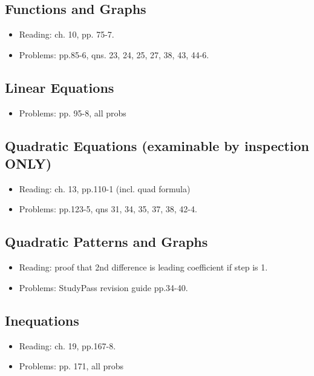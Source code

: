 \documentclass[a4paper]{amsart}
\theoremstyle{definition}
\theoremstyle{remark}
\begin{document}
  \subsection{Functions and Graphs}
  \begin{itemize}
    \item Reading: ch. 10, pp. 75-7.
    \item Problems: pp.85-6, qns. 23, 24, 25, 27, 38, 43, 44-6.
  \end{itemize}

  \subsection{Linear Equations}
  \begin{itemize}
    \item Problems: pp. 95-8, all probs
  \end{itemize}

  \subsection{Quadratic Equations (examinable by inspection ONLY)}
  \begin{itemize}
    \item Reading: ch. 13, pp.110-1 (incl. quad formula)
    \item Problems: pp.123-5, qns 31, 34, 35, 37, 38, 42-4.
  \end{itemize}

  \subsection{Quadratic Patterns and Graphs}
  \begin{itemize}
    \item Reading: proof that 2nd difference is leading coefficient if step is 1.
    \item Problems: StudyPass revision guide pp.34-40.
  \end{itemize}

  \subsection{Inequations}
  \begin{itemize}
    \item Reading: ch. 19, pp.167-8.
    \item Problems: pp. 171, all probs
  \end{itemize}
\end{document}
